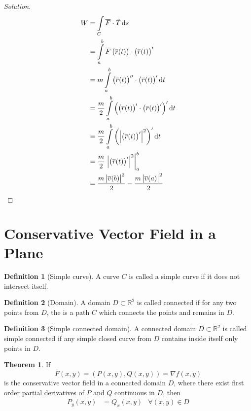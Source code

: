 \documentclass[fleqn, a4paper, 12pt]{article}
\theoremstyle{definition}
\newtheorem{definition}{Definition}
\theoremstyle{theorem}
\newtheorem{theorem}{Theorem}
\theoremstyle{remark}
\newenvironment{solution}
{\begin{proof}[Solution]\let\qed\relax}
	{\end{proof}}
\begin{document}
\begin{solution}
	\begin{align*}
		W &= \int\limits_{C} \overline{F} \cdot \hat{T} \dif s\\
		&= \int\limits_{a}^{b} \overline{F} \left( \overline{r}(t) \right) \cdot \left( \overline{r}(t) \right)'\\
		&= m \int\limits_{a}^{b} \left( \overline{r}(t) \right)'' \cdot \left( \overline{r}(t) \right)' \dif t\\
		&= \dfrac{m}{2} \int\limits_{a}^{b} \left( \left( \overline{r}(t) \right)' \cdot \left( \overline{r}(t) \right)' \right)' \dif t\\
		&= \dfrac{m}{2} \int\limits_{a}^{b} \left( \left\lvert \left( \overline{r}(t) \right)' \right\rvert^2 \right)' \dif t\\
		&= \dfrac{m}{2} \left. \left\lvert \left( \overline{r}(t) \right)' \right\rvert^2 \right\rvert_{a}^{b}\\
		&= \dfrac{m \left\lvert \overline{v}(b) \right\rvert^2}{2} - \dfrac{m \left\lvert \overline{v}(a) \right\rvert^2}{2}
	\end{align*}
\end{solution}

\section{Conservative Vector Field in a Plane}

\begin{definition}[Simple curve]
	A curve $C$ is called a simple curve if it does not intersect itself.
\end{definition}

\begin{definition}[Domain]
	A domain $D \subset \mathbb{R}^2$ is called connected if for any two points from $D$, the is a path $C$ which connects the points and remains in $D$.
\end{definition}

\begin{definition}[Simple connected domain]
	A connected domain $D \subset \mathbb{R}^2$ is called simple connected if any simple closed curve from $D$ contains inside itself only points in $D$.
\end{definition}

\begin{theorem}
	If
	\begin{equation*}
		\overline{F}(x,y) = \left( P(x,y), Q(x,y) \right) = \nabla f(x,y)
	\end{equation*}
	is the conservative vector field in a connected domain $D$, where there exist first order partial derivatives of $P$ and $Q$ continuous in $D$, then
	\begin{align*}
		P_y(x,y) &= Q_x(x,y) &\forall (x,y) \in D
	\end{align*}
\end{theorem}
\end{document}
